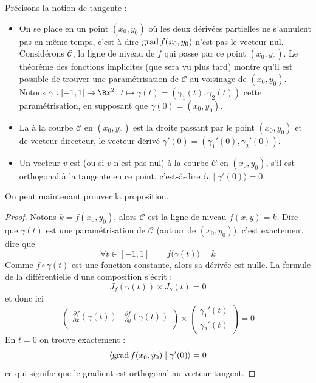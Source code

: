 \documentclass[12pt, class=report,crop=false]{standalone}
\begin{document}
Précisons la notion de tangente :
\begin{itemize}
  \item On se place en un point $(x_0,y_0)$ où les deux dérivées partielles ne s'annulent pas en même temps, c'est-à-dire $\operatorname{grad} f(x_0,y_0)$ n'est pas le vecteur nul. Considérons $\mathcal{C}$, la ligne de niveau de $f$ qui passe par ce point $(x_0,y_0)$. Le théorème des fonctions implicites (que sera vu plus tard) montre qu'il est possible de trouver une paramétrisation de $\mathcal{C}$ au voisinage de $(x_0,y_0)$. Notons $\gamma : [-1,1] \to \Rr^2$, $t \mapsto \gamma(t)= (\gamma_1(t),\gamma_2(t))$ cette paramétrisation, en supposant que $\gamma(0) = (x_0,y_0)$. 


  \item La  à la courbe $\mathcal{C}$ en $(x_0,y_0)$ est la droite passant par le point $(x_0,y_0)$ et de vecteur directeur, le vecteur dérivé $\gamma'(0) = (\gamma_1'(0),\gamma_2'(0))$.
  
  \item Un vecteur $v$ est  (ou  si $v$ n'est pas nul) à la courbe $\mathcal{C}$ en $(x_0,y_0)$, s'il est orthogonal à la tangente en ce point, c'est-à-dire $\langle v \mid \gamma'(0)\rangle = 0$.
\end{itemize}

On peut maintenant prouver la proposition.
\begin{proof}
Notons $k = f(x_0,y_0)$, alors $\mathcal{C}$ est la ligne de niveau $f(x,y)=k$.
Dire que $\gamma(t)$ est une paramétrisation de $\mathcal{C}$ (autour de $(x_0,y_0)$), 
c'est exactement dire 
que 
$$\forall t \in [-1,1] \qquad f \big( \gamma(t) \big) = k$$
Comme $f \circ \gamma (t)$ est une fonction constante, alors sa dérivée est nulle.
La formule de la différentielle d'une composition s'écrit :
$$J_f (\gamma(t)) \times J_\gamma (t) = 0$$
et donc ici 
$$
\begin{pmatrix}
\frac{\partial f}{\partial x} (\gamma(t)) & 
\frac{\partial f}{\partial y} (\gamma(t)) \\
\end{pmatrix}
\times
\begin{pmatrix}
\gamma_1'(t)\\
\gamma_2'(t)
\end{pmatrix}
= 0$$
En $t=0$ on trouve exactement :
$$\langle \operatorname{grad} f(x_0,y_0) \mid \gamma'(0) \rangle = 0$$
ce qui signifie que le gradient est orthogonal au vecteur tangent.
\end{proof}
\end{document}
